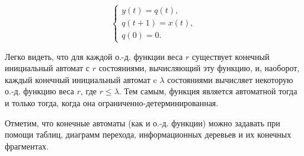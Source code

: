 \begin{example}
\begin{figure}[h]
\begin{minipage}[c]{0.54\textwidth}
\begin{center}
                \[
                    \begin{cases}
                        y(t) = q(t),\\
                        q(t+1) = x(t),\\
                        q(0) = 0.
                    \end{cases}
                \]
            \end{center}
        \end{minipage}
    \end{figure}    
\end{example}

Легко видеть, что для каждой о.-д. функции веса $r$ существует конечный инициальный автомат с $r$ состояниями, вычисляющий эту функцию, и, наоборот, каждый конечный инициальный автомат c $\lambda$ состояниями вычисляет некоторую о.-д. функцию веса $r$, где $r\leqslant \lambda$. Тем самым, функция является автоматной тогда и только тогда, когда она ограниченно-детерминированная.

Отметим, что конечные автоматы (как и о.-д. функции) можно задавать при помощи таблиц, диаграмм перехода, информационных деревьев и их конечных фрагментах.